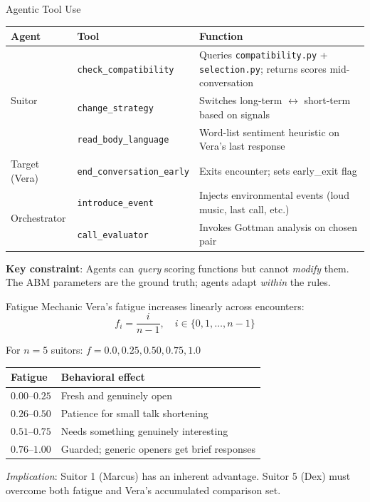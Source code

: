 \documentclass[aspectratio=169, 11pt]{beamer}
\begin{document}
\begin{frame}{Agentic Tool Use}
\small
\begin{tabular}{@{}llp{6.5cm}@{}}
\toprule
\textbf{Agent} & \textbf{Tool} & \textbf{Function} \\
\midrule
\multirow{3}{*}{Suitor} & \texttt{check\_compatibility} & Queries \texttt{compatibility.py} + \texttt{selection.py}; returns scores mid-conversation \\
 & \texttt{change\_strategy} & Switches long-term $\leftrightarrow$ short-term based on signals \\
 & \texttt{read\_body\_language} & Word-list sentiment heuristic on Vera's last response \\
\midrule
Target (Vera) & \texttt{end\_conversation\_early} & Exits encounter; sets early\_exit flag \\
\midrule
\multirow{2}{*}{Orchestrator} & \texttt{introduce\_event} & Injects environmental events (loud music, last call, etc.) \\
 & \texttt{call\_evaluator} & Invokes Gottman analysis on chosen pair \\
\bottomrule
\end{tabular}

\vspace{0.8em}
\textbf{Key constraint}: Agents can \textit{query} scoring functions but cannot \textit{modify} them.\\
The ABM parameters are the ground truth; agents adapt \textit{within} the rules.
\end{frame}

\begin{frame}{Fatigue Mechanic}
Vera's fatigue increases linearly across encounters:
\[
f_i = \frac{i}{n - 1}, \quad i \in \{0, 1, \ldots, n-1\}
\]

For $n = 5$ suitors: $f = 0.0, 0.25, 0.50, 0.75, 1.0$

\vspace{0.5em}
\begin{tabular}{@{}ll@{}}
\toprule
\textbf{Fatigue} & \textbf{Behavioral effect} \\
\midrule
$0.00$--$0.25$ & Fresh and genuinely open \\
$0.26$--$0.50$ & Patience for small talk shortening \\
$0.51$--$0.75$ & Needs something genuinely interesting \\
$0.76$--$1.00$ & Guarded; generic openers get brief responses \\
\bottomrule
\end{tabular}

\vspace{0.8em}
\textit{Implication}: Suitor 1 (Marcus) has an inherent advantage. Suitor 5 (Dex) must overcome both fatigue and Vera's accumulated comparison set.
\end{frame}
\end{document}
